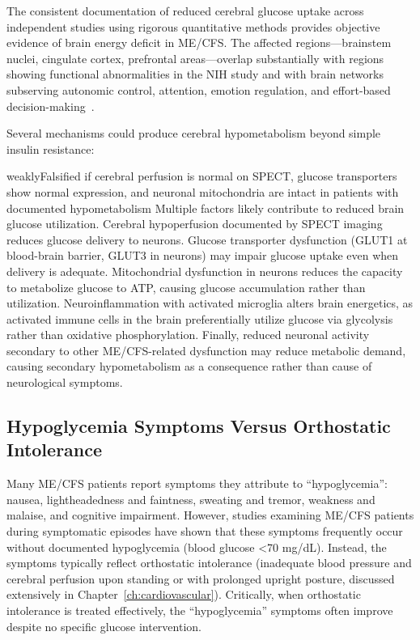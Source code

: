 The consistent documentation of reduced cerebral glucose uptake across independent studies using rigorous quantitative methods provides objective evidence of brain energy deficit in ME/CFS. The affected regions---brainstem nuclei, cingulate cortex, prefrontal areas---overlap substantially with regions showing functional abnormalities in the NIH study and with brain networks subserving autonomic control, attention, emotion regulation, and effort-based decision-making~\cite{walitt2024deep}.

Several mechanisms could produce cerebral hypometabolism beyond simple insulin resistance:

\begin{fhypothesis}{weakly}{Falsified if cerebral perfusion is normal on SPECT, glucose transporters show normal expression, and neuronal mitochondria are intact in patients with documented hypometabolism}
\label{hyp:brain-hypometabolism}
Multiple factors likely contribute to reduced brain glucose utilization. Cerebral hypoperfusion documented by SPECT imaging reduces glucose delivery to neurons. Glucose transporter dysfunction (GLUT1 at blood-brain barrier, GLUT3 in neurons) may impair glucose uptake even when delivery is adequate. Mitochondrial dysfunction in neurons reduces the capacity to metabolize glucose to ATP, causing glucose accumulation rather than utilization. Neuroinflammation with activated microglia alters brain energetics, as activated immune cells in the brain preferentially utilize glucose via glycolysis rather than oxidative phosphorylation. Finally, reduced neuronal activity secondary to other ME/CFS-related dysfunction may reduce metabolic demand, causing secondary hypometabolism as a consequence rather than cause of neurological symptoms.
\end{fhypothesis}

\subsection{Hypoglycemia Symptoms Versus Orthostatic Intolerance}

\begin{warning}
\label{warn:hypoglycemia-misattribution}
Many ME/CFS patients report symptoms they attribute to ``hypoglycemia'': nausea, lightheadedness and faintness, sweating and tremor, weakness and malaise, and cognitive impairment. However, studies examining ME/CFS patients during symptomatic episodes have shown that these symptoms frequently occur without documented hypoglycemia (blood glucose <70 mg/dL). Instead, the symptoms typically reflect orthostatic intolerance (inadequate blood pressure and cerebral perfusion upon standing or with prolonged upright posture, discussed extensively in Chapter~\ref{ch:cardiovascular}). Critically, when orthostatic intolerance is treated effectively, the ``hypoglycemia'' symptoms often improve despite no specific glucose intervention.
\end{warning}

